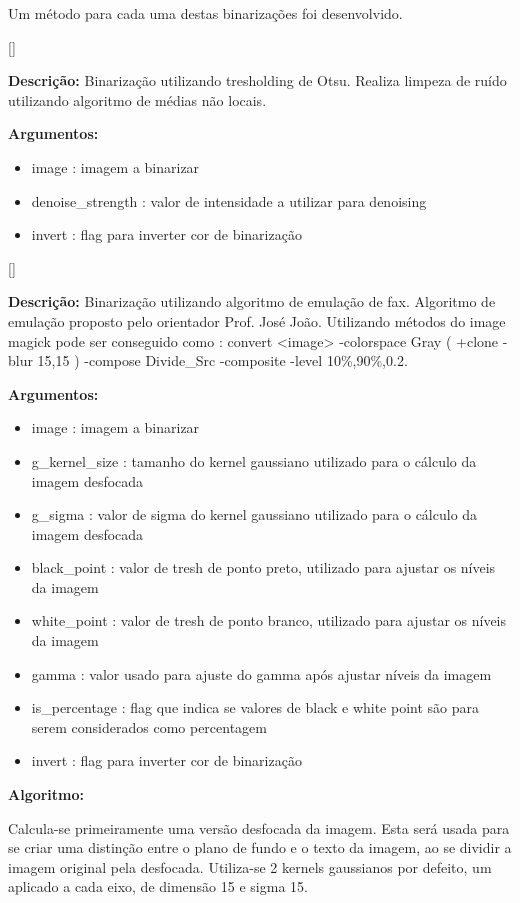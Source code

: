 Um método para cada uma destas binarizações foi desenvolvido.

[\normalsize]

\textbf{Descrição:} Binarização utilizando tresholding de Otsu. Realiza limpeza de ruído utilizando algoritmo de médias não locais.

\textbf{Argumentos:}
\begin{itemize}\setlength\itemsep{-0.3em}
	\item image : imagem a binarizar
	\item denoise\_strength : valor de intensidade a utilizar para denoising
	\item invert : flag para inverter cor de binarização
\end{itemize}

[\normalsize]

\textbf{Descrição:} Binarização utilizando algoritmo de emulação de fax. Algoritmo de emulação proposto pelo orientador Prof. José João. Utilizando métodos do image magick pode ser conseguido como : convert <image> -colorspace Gray ( +clone -blur 15,15 ) -compose Divide\_Src -composite -level 10\%,90\%,0.2.


\textbf{Argumentos:}
\begin{itemize}\setlength\itemsep{-0.3em}
	\item image : imagem a binarizar
	\item g\_kernel\_size : tamanho do kernel gaussiano utilizado para o cálculo da imagem desfocada
	\item g\_sigma : valor de sigma do kernel gaussiano utilizado para o cálculo da imagem desfocada
	\item black\_point : valor de tresh de ponto preto, utilizado para ajustar os níveis da imagem
	\item white\_point : valor de tresh de ponto branco, utilizado para ajustar os níveis da imagem 
	\item gamma : valor usado para ajuste do gamma após ajustar níveis da imagem
	\item is\_percentage : flag que indica se valores de black e white point são para serem considerados como percentagem
	\item invert : flag para inverter cor de binarização
\end{itemize}

\textbf{Algoritmo:}

Calcula-se primeiramente uma versão desfocada da imagem. Esta será usada para se criar uma distinção entre o plano de fundo e o texto da imagem, ao se dividir a imagem original pela desfocada. Utiliza-se 2 kernels gaussianos por defeito, um aplicado a cada eixo, de dimensão 15 e sigma 15.

